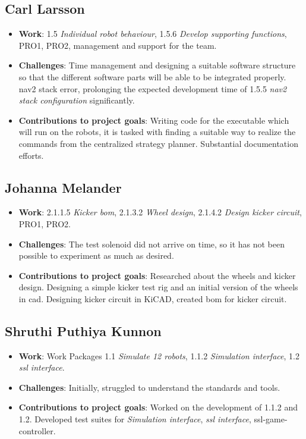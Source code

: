 \subsection*{Carl Larsson}
\begin{itemize}
    \item \textbf{Work}: 1.5 \textit{Individual robot behaviour}, 1.5.6 \textit{Develop supporting functions}, PRO1, PRO2, management and support for the team.
    \item \textbf{Challenges}: Time management and designing a suitable software structure so that the different software parts will be able to be integrated properly. nav2 stack error, prolonging the expected development time of 1.5.5 \textit{nav2 stack configuration} significantly.
    \item \textbf{Contributions to project goals}: Writing code for the executable which will run on the robots, it is tasked with finding a suitable way to realize the commands from the centralized strategy planner. Substantial documentation efforts.
\end{itemize}
\subsection*{Johanna Melander}
\begin{itemize}
    \item \textbf{Work}: 2.1.1.5 \textit{Kicker \acs{bom}}, 2.1.3.2 \textit{Wheel design}, 2.1.4.2 \textit{Design kicker circuit}, PRO1, PRO2.
    \item \textbf{Challenges}:
    The test solenoid did not arrive on time, so it has not been possible to experiment as much as desired. 
    \item \textbf{Contributions to project goals}:
    Researched about the wheels and kicker design. Designing a simple kicker test rig and an initial version of the wheels in \ac{cad}. Designing kicker circuit in KiCAD, created \ac{bom} for kicker circuit. 
\end{itemize}
\subsection*{Shruthi Puthiya Kunnon}
\begin{itemize}
    \item \textbf{Work}: Work Packages 1.1 \textit{Simulate 12 robots}, 1.1.2 \textit{Simulation interface}, 1.2 \textit{\acs{ssl} interface}. 
    \item \textbf{Challenges}: Initially, struggled to understand the standards and tools.
    \item \textbf{Contributions to project goals}: Worked on the development of 1.1.2 and 1.2. Developed test suites for \textit{Simulation interface}, \textit{\acs{ssl} interface}, ssl-game-controller. 
\end{itemize}
